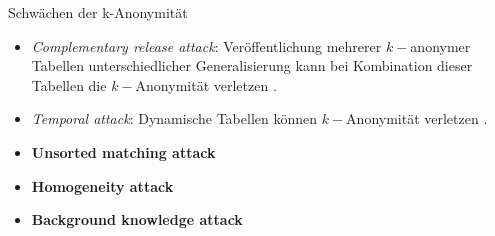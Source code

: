 \begin{frame}{Schwächen der k-Anonymität}
	\begin{itemize}
		\item \textit{Complementary release attack}: Veröffentlichung mehrerer \(k-\)anonymer Tabellen unterschiedlicher Generalisierung kann bei Kombination dieser Tabellen die \(k-\)Anonymität verletzen \cite{sweeney_k_anonymity}. %
	
		\item \textit{Temporal attack}: Dynamische Tabellen können \(k-\)Anonymität verletzen \cite{sweeney_k_anonymity}. %

		\item \textbf{Unsorted matching attack} \cite{sweeney_k_anonymity} %

		\item \textbf{Homogeneity attack} \cite{machanavajjhala_l_diversity} %
	
		\item \textbf{Background knowledge attack} \cite{machanavajjhala_l_diversity} %
	\end{itemize}
\end{frame}


